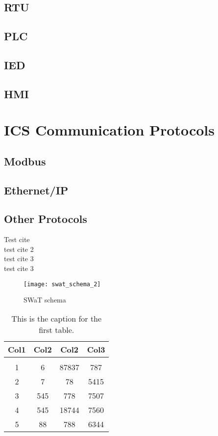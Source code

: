 \subsection{RTU}
\subsection{PLC}
\subsection{IED}
\subsection{HMI}

\section{ICS Communication Protocols}
\label{sec:ics_protocols}
\subsection{Modbus}
\subsection{Ethernet/IP}
\subsection{Other Protocols}

Test cite \cite{ceccato} \\
test cite 2 \cite{itrust_swat} \\
test cite 3 \cite{itrust_site} \\
test cite 3 \cite{itrust_invariants_paper}\\

\begin{figure}[h]
	\texttt{[image: swat\_schema\_2]}
	\caption{SWaT schema}
	\label{fig:Schema SWaT}
\end{figure}

\begin{table}
	\centering
	\begin{tabular}{||c c c c||} 
		\hline
		Col1 & Col2 & Col2 & Col3 \\ [0.5ex] 
		\hline
		 & & & \\
		1 & 6 & 87837 & 787 \\ 
		2 & 7 & 78 & 5415 \\
		3 & 545 & 778 & 7507 \\
		4 & 545 & 18744 & 7560 \\
		5 & 88 & 788 & 6344 \\ [1ex] 
		\hline
	\end{tabular}
	\caption{This is the caption for the first table.}
	\label{table:1}
\end{table}
